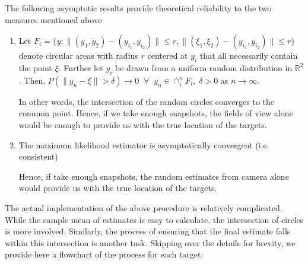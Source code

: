 The following asymptotic results provide theoretical reliability to the two measures mentioned above

\begin{enumerate}
\item Let $F_i=\{y : \| (y_1,y_2) -(y_{i_1},y_{i_2})\| \leq r, \| (\xi_1,\xi_2) -(y_{i_1},y_{i_2})\| \leq r \}$ denote circular areas with radius $r$ centered at $y_i$ that all necessarily contain the point $\xi$. Further let $y_i$ be drawn from a uniform random distribution in $\mathbb{R}^2$. Then, $P(\| y_n - \xi \| > \delta) \rightarrow 0 \; \; \forall \; \; y_n \in \cap_i^n F_i, \; \delta>0 $ as $n \rightarrow \infty$. 

In other words, the intersection of the random circles converges to the common point. Hence, if we take enough snapshots, the fields of view alone would be enough to provide us with the true location of the targets.

\item The maximum likelihood estimator is asymptotically convergent (i.e. consistent)

Hence, if take enough snapshots, the random estimates from camera alone would provide us with the true location of the targets.
\end{enumerate}

The actual implementation of the above procedure is relatively complicated. While the sample mean of estimates is easy to calculate, the intersection of circles is more involved. Similarly, the process of ensuring that the final estimate falls within this intersection is another task. Skipping over the details for brevity, we provide here a flowchart of the process for each target:

